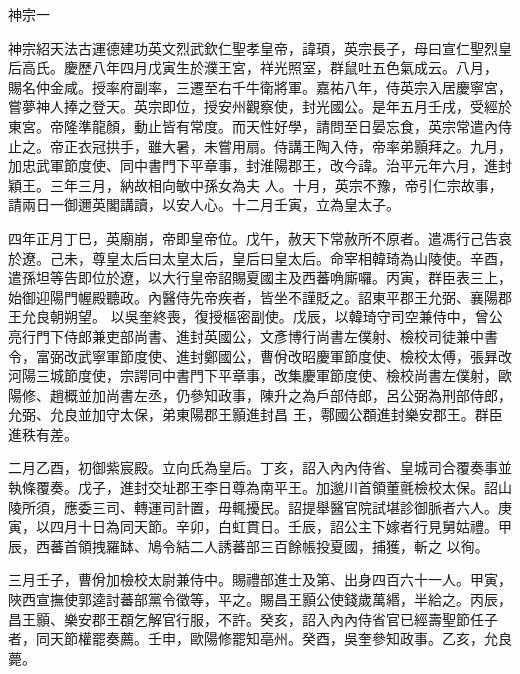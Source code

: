 
\begin{pinyinscope}

 神宗一



 神宗紹天法古運德建功英文烈武欽仁聖孝皇帝，諱頊，英宗長子，母曰宣仁聖烈皇后高氏。慶歷八年四月戊寅生於濮王宮，祥光照室，群鼠吐五色氣成云。八月，
 賜名仲金咸。授率府副率，三遷至右千牛衛將軍。嘉祐八年，侍英宗入居慶寧宮，嘗夢神人捧之登天。英宗即位，授安州觀察使，封光國公。是年五月壬戌，受經於東宮。帝隆準龍顏，動止皆有常度。而天性好學，請問至日晏忘食，英宗常遣內侍止之。帝正衣冠拱手，雖大暑，未嘗用扇。侍講王陶入侍，帝率弟顥拜之。九月，加忠武軍節度使、同中書門下平章事，封淮陽郡王，改今諱。治平元年六月，進封穎王。三年三月，納故相向敏中孫女為夫
 人。十月，英宗不豫，帝引仁宗故事，請兩日一御邇英閣講讀，以安人心。十二月壬寅，立為皇太子。



 四年正月丁巳，英廟崩，帝即皇帝位。戊午，赦天下常赦所不原者。遣馮行己告哀於遼。己未，尊皇太后曰太皇太后，皇后曰皇太后。命宰相韓琦為山陵使。辛酉，遣孫坦等告即位於遼，以大行皇帝詔賜夏國主及西蕃唃廝囉。丙寅，群臣表三上，始御迎陽門幄殿聽政。內醫侍先帝疾者，皆坐不謹貶之。詔東平郡王允弼、襄陽郡王允良朝朔望。
 以吳奎終喪，復授樞密副使。戊辰，以韓琦守司空兼侍中，曾公亮行門下侍郎兼吏部尚書、進封英國公，文彥博行尚書左僕射、檢校司徒兼中書令，富弼改武寧軍節度使、進封鄭國公，曹佾改昭慶軍節度使、檢校太傅，張昪改河陽三城節度使，宗諤同中書門下平章事，改集慶軍節度使、檢校尚書左僕射，歐陽修、趙概並加尚書左丞，仍參知政事，陳升之為戶部侍郎，呂公弼為刑部侍郎，允弼、允良並加守太保，弟東陽郡王顥進封昌
 王，鄠國公頵進封樂安郡王。群臣進秩有差。



 二月乙酉，初御紫宸殿。立向氏為皇后。丁亥，詔入內內侍省、皇城司合覆奏事並執條覆奏。戊子，進封交址郡王李日尊為南平王。加邈川首領董氈檢校太保。詔山陵所須，應委三司、轉運司計置，毋輒擾民。詔提舉醫官院試堪診御脈者六人。庚寅，以四月十日為同天節。辛卯，白虹貫日。壬辰，詔公主下嫁者行見舅姑禮。甲辰，西蕃首領拽羅缽、鳩令結二人誘蕃部三百餘帳投夏國，捕獲，斬之
 以徇。



 三月壬子，曹佾加檢校太尉兼侍中。賜禮部進士及第、出身四百六十一人。甲寅，陜西宣撫使郭逵討蕃部黨令徵等，平之。賜昌王顥公使錢歲萬緡，半給之。丙辰，昌王顥、樂安郡王頵乞解官行服，不許。癸亥，詔入內內侍省官已經壽聖節任子者，同天節權罷奏薦。壬申，歐陽修罷知亳州。癸酉，吳奎參知政事。乙亥，允良薨。




\end{pinyinscope}
